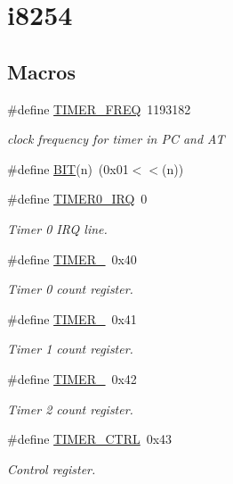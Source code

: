 \hypertarget{group__i8254}{}\section{i8254}
\label{group__i8254}
\subsection*{Macros}
\begin{DoxyCompactItemize}
\item 
\#define \hyperlink{group__i8254_gacf926951944b6cf370b7229ebd50dd8b}{T\+I\+M\+E\+R\+\_\+\+F\+R\+EQ}~1193182
\begin{DoxyCompactList}\small\item\em clock frequency for timer in PC and AT \end{DoxyCompactList}\item 
\#define \hyperlink{group__i8254_ga3a8ea58898cb58fc96013383d39f482c}{B\+IT}(n)~(0x01$<$$<$(n))
\item 
\#define \hyperlink{group__i8254_ga30bf84c312af248cb81bb224e09f9ba8}{T\+I\+M\+E\+R0\+\_\+\+I\+RQ}~0
\begin{DoxyCompactList}\small\item\em Timer 0 I\+RQ line. \end{DoxyCompactList}\item 
\#define \hyperlink{group__i8254_gacc9ff9df4a9674a1ce9ba08fc4a4679e}{T\+I\+M\+E\+R\+\_}~0x40
\begin{DoxyCompactList}\small\item\em Timer 0 count register. \end{DoxyCompactList}\item 
\#define \hyperlink{group__i8254_gac62c99c2a9289891c1b83052242cca49}{T\+I\+M\+E\+R\+\_}~0x41
\begin{DoxyCompactList}\small\item\em Timer 1 count register. \end{DoxyCompactList}\item 
\#define \hyperlink{group__i8254_ga1f34f18ad0ab8cace46b615773b48735}{T\+I\+M\+E\+R\+\_}~0x42
\begin{DoxyCompactList}\small\item\em Timer 2 count register. \end{DoxyCompactList}\item 
\#define \hyperlink{group__i8254_ga282832448fb0281ef53d243c1cd48491}{T\+I\+M\+E\+R\+\_\+\+C\+T\+RL}~0x43
\begin{DoxyCompactList}\small\item\em Control register. \end{DoxyCompactList}\item 
$$
\end{DoxyCompactItemize}

